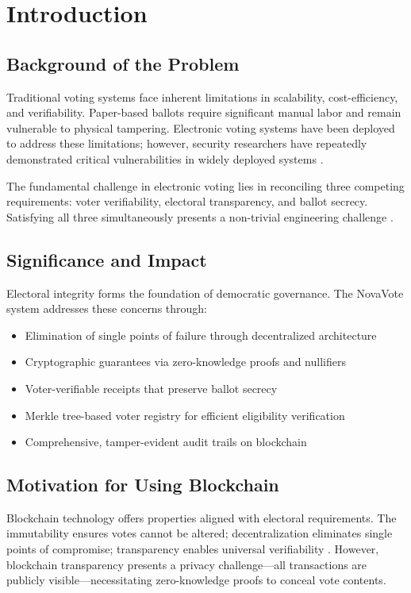 \documentclass[conference]{IEEEtran}
\begin{document}
\section{Introduction}

\subsection{Background of the Problem}
Traditional voting systems face inherent limitations in scalability, cost-efficiency, and verifiability. Paper-based ballots require significant manual labor and remain vulnerable to physical tampering. Electronic voting systems have been deployed to address these limitations; however, security researchers have repeatedly demonstrated critical vulnerabilities in widely deployed systems \cite{voting_security}.

The fundamental challenge in electronic voting lies in reconciling three competing requirements: voter verifiability, electoral transparency, and ballot secrecy. Satisfying all three simultaneously presents a non-trivial engineering challenge \cite{zkp_voting}.

\subsection{Significance and Impact}
Electoral integrity forms the foundation of democratic governance. The NovaVote system addresses these concerns through:
\begin{itemize}
    \item Elimination of single points of failure through decentralized architecture
    \item Cryptographic guarantees via zero-knowledge proofs and nullifiers
    \item Voter-verifiable receipts that preserve ballot secrecy
    \item Merkle tree-based voter registry for efficient eligibility verification
    \item Comprehensive, tamper-evident audit trails on blockchain
\end{itemize}

\subsection{Motivation for Using Blockchain}
Blockchain technology offers properties aligned with electoral requirements. The immutability ensures votes cannot be altered; decentralization eliminates single points of compromise; transparency enables universal verifiability \cite{ethereum_voting}. However, blockchain transparency presents a privacy challenge---all transactions are publicly visible---necessitating zero-knowledge proofs to conceal vote contents.
\end{document}
